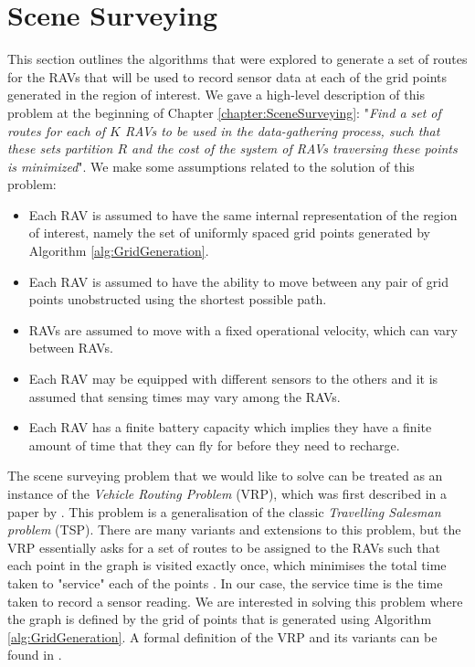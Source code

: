
\section{Scene Surveying}\label{sec:SceneSurveying}
This section outlines the algorithms that were explored to generate a set of routes for the RAVs that will be used to record sensor data at each of the grid points generated in the region of interest. We gave a high-level description of this problem at the beginning of Chapter \ref{chapter:SceneSurveying}:
"\textit{Find a set of routes for each of $K$ RAVs to be used in the data-gathering process, such that these sets partition $R$ and the cost of the system of RAVs traversing these points is minimized}".
We make some assumptions related to the solution of this problem:
\begin{itemize}
    \item Each RAV is assumed to have the same internal representation of the region of interest, namely the set of uniformly spaced grid points generated by Algorithm \ref{alg:GridGeneration}.
    \item Each RAV is assumed to have the ability to move between any pair of grid points unobstructed using the shortest possible path.
    \item RAVs are assumed to move with a fixed operational velocity, which can vary between RAVs.
    \item Each RAV may be equipped with different sensors to the others and it is assumed that sensing times may vary among the RAVs.
    \item Each RAV has a finite battery capacity which implies they have a finite amount of time that they can fly for before they need to recharge.
\end{itemize}


The scene surveying problem that we would like to solve can be treated as an instance of the \textit{Vehicle Routing Problem} (VRP), which was first described in a paper by \citeauthor{Dantzig1959TheProblem} \cite{Dantzig1959TheProblem}. This problem is a generalisation of the classic \textit{Travelling Salesman problem} (TSP). There are many variants and extensions to this problem, but the VRP essentially asks for a set of routes to be assigned to the RAVs such that each point in the graph is visited exactly once, which minimises the total time taken to "service" each of the points \cite{Dantzig1959TheProblem}. In our case, the service time is the time taken to record a sensor reading. We are interested in solving this problem where the graph is defined by the grid of points that is generated using Algorithm \ref{alg:GridGeneration}. A formal definition of the VRP and its variants can be found in \cite{Toth2002TheProblem}.

